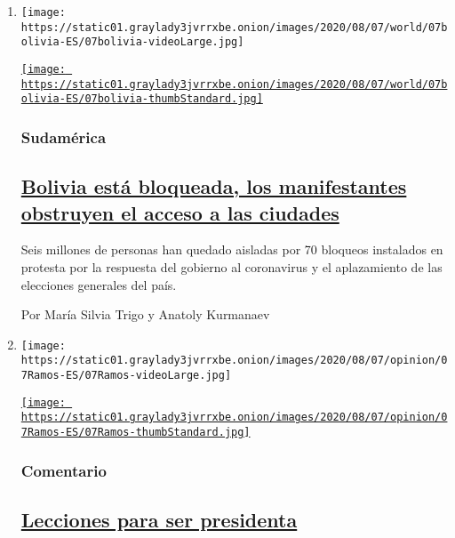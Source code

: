 \begin{enumerate}
\def\labelenumi{\arabic{enumi}.}
\item
  \texttt{[image: https://static01.graylady3jvrrxbe.onion/images/2020/08/07/world/07bolivia-ES/07bolivia-videoLarge.jpg]}

  \href{/es/2020/08/07/espanol/bloqueos-bolivia.html}{\texttt{[image: https://static01.graylady3jvrrxbe.onion/images/2020/08/07/world/07bolivia-ES/07bolivia-thumbStandard.jpg]}}

  \hypertarget{sudamuxe9rica}{%
  \subsubsection{Sudamérica}\label{sudamuxe9rica}}

  \hypertarget{bolivia-estuxe1-bloqueada-los-manifestantes-obstruyen-el-acceso-a-las-ciudades}{%
  \subsection{\texorpdfstring{\href{/es/2020/08/07/espanol/bloqueos-bolivia.html}{Bolivia
  está bloqueada, los manifestantes obstruyen el acceso a las
  ciudades}}{Bolivia está bloqueada, los manifestantes obstruyen el acceso a las ciudades}}\label{bolivia-estuxe1-bloqueada-los-manifestantes-obstruyen-el-acceso-a-las-ciudades}}

  Seis millones de personas han quedado aisladas por 70 bloqueos
  instalados en protesta por la respuesta del gobierno al coronavirus y
  el aplazamiento de las elecciones generales del país.

  Por María Silvia Trigo y Anatoly Kurmanaev
\item
  \texttt{[image: https://static01.graylady3jvrrxbe.onion/images/2020/08/07/opinion/07Ramos-ES/07Ramos-videoLarge.jpg]}

  \href{/es/2020/08/07/espanol/opinion/presidenta-estados-unidos.html}{\texttt{[image: https://static01.graylady3jvrrxbe.onion/images/2020/08/07/opinion/07Ramos-ES/07Ramos-thumbStandard.jpg]}}

  \hypertarget{comentario}{%
  \subsubsection{Comentario}\label{comentario}}

  \hypertarget{lecciones-para-ser-presidenta}{%
  \subsection{\texorpdfstring{\href{/es/2020/08/07/espanol/opinion/presidenta-estados-unidos.html}{Lecciones
  para ser
  presidenta}}{Lecciones para ser presidenta}}\label{lecciones-para-ser-presidenta}}


\end{enumerate}
